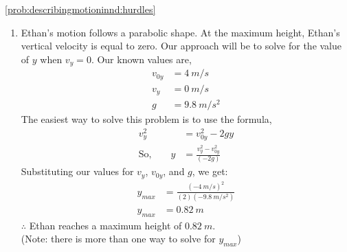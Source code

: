 \begin{solution}{\ref{prob:describingmotioninnd:hurdles}}
{\begin{enumerate}[label=\alph*)]
We are interested in the value of $x$ when the vertical displacement $y$ is equal to the height of the hurdle. So we will find the value of $t$ when $y=\SI{0.5}{m}$ and find the value of $x$ at this time.\\

First, rearrange the equation for $y$ and solve the quadratic:
\begin{align*}
0&=-\frac{1}{2}gt^2+v_{0y}t-y\\
0&=\frac{1}{2}(\SI{-9.8}{m/s^2})t^2+(\SI{4}{m/s})t-\SI{0.5}{m}\\
t&=\SI{0.15}{s},\quad \SI{0.66}{s}
\end{align*}
We want to know when Ethan reaches $\SI{0.5}{m}$ for the first time, so $t=\SI{0.15}{s}$. All that's left is to find the horizontal displacement at this time:
\begin{align*}
x&=v_xt\\
&=(\SI{3}{m/s})(\SI{0.15}{s})\\
&=\SI{0.45}{m}
\end{align*}
$\therefore$ he can get as close as $\SI{0.45}{m}$ from the hurdle before he has to jump, if his initial horizontal velocity is $\SI{3}{m/s}$.
\item Ethan's motion follows a parabolic shape. At the maximum height, Ethan's vertical velocity is equal to zero. Our approach will be to solve for the value of $y$ when $v_y=0$. Our known values are,
\begin{align*}
v_{0y}&=\SI{4}{m/s}\\
v_y&=\SI{0}{m/s}\\
g&=\SI{9.8}{m/s^2}
\end{align*}
The easiest way to solve this problem is to use the formula, 
\begin{align*}
v_y^2&=v_{0y}^2-2gy\\
\textrm{So,}\qquad y&=\frac{v_y^2-v_{0y}^2}{(-2g)}
\end{align*}
Substituting our values for $v_y$, $v_{0y}$, and $g$, we get:
\begin{align*}
y_{max}&=\frac{(\SI{-4}{m/s})^2}{(2)(\SI{-9.8}{m/s^2})}\\
y_{max}&=\SI{0.82}{m}
\end{align*}
$\therefore$ Ethan reaches a maximum height of $\SI{0.82}{m}$. \\

(Note: there is more than one way to solve for $y_{max}$)
\end{enumerate}}
\end{solution}

